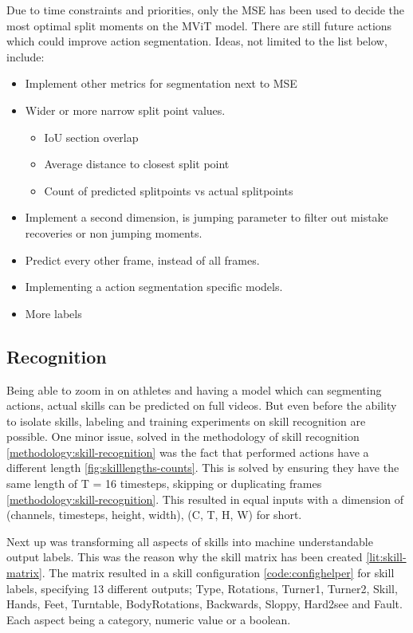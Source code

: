 Due to time constraints and priorities, only the MSE has been used to decide the most optimal split moments on the MViT model. There are still future actions which could improve action segmentation. Ideas, not limited to the list below, include:

\begin{itemize}
    \item Implement other metrics for segmentation next to MSE
    \item Wider or more narrow split point values.
        \begin{itemize}
            \item IoU section overlap
            \item Average distance to closest split point
            \item Count of predicted splitpoints vs actual splitpoints
        \end{itemize}
    \item Implement a second dimension, is jumping parameter to filter out mistake recoveries or non jumping moments.
    \item Predict every other frame, instead of all frames.
    \item Implementing a action segmentation specific models.
    \item More labels
\end{itemize}

\subsection{Recognition}

Being able to zoom in on athletes and having a model which can segmenting actions, actual skills can be predicted on full videos.
But even before the ability to isolate skills, labeling and training experiments on skill recognition are possible. One minor issue, solved in the methodology of skill recognition \ref{methodology:skill-recognition} was the fact that performed actions have a different length \ref{fig:skilllengths-counts}. This is solved by ensuring they have the same length of T = 16 timesteps, skipping or duplicating frames \ref{methodology:skill-recognition}. This resulted in equal inputs with a dimension of (channels, timesteps, height, width), (C, T, H, W) for short.

Next up was transforming all aspects of skills into machine understandable output labels. This was the reason why the skill matrix has been created \ref{lit:skill-matrix}. The matrix resulted in a skill configuration \ref{code:confighelper} for skill labels, specifying 13 different outputs; Type, Rotations, Turner1, Turner2, Skill, Hands, Feet, Turntable, BodyRotations, Backwards, Sloppy, Hard2see and Fault. Each aspect being a category, numeric value or a boolean.

